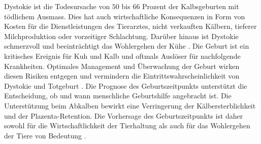Dystokie ist die Todesursache von $50$ bis $66$ Prozent der Kalbsgeburten mit tödlichem Ausmass. Dies hat auch wirtschaftliche Konsequenzen in Form von Kosten für die Dienstleistungen des Tierarztes, nicht verkauften Kälbern, tieferer Milchproduktion oder vorzeitiger Schlachtung. Darüber hinaus ist Dystokie schmerzvoll und beeinträchtigt das Wohlergehen der Kühe \citep[S. 1]{Saint-Dizier2015}. Die Geburt ist ein kritisches Ereignis für Kuh und Kalb und oftmals Auslöser für nachfolgende Krankheiten. Optimales Management und Überwachung der Geburt wirken diesen Risiken entgegen und vermindern die Eintrittswahrscheinlichkeit von Dystokie und Totgeburt \citep[S. 1]{Lange2017}. Die Prognose des Geburtszeitpunkts unterstützt die Entscheidung, ob und wann menschliche Geburtshilfe angebracht ist. Die Unterstützung beim Abkalben bewirkt eine Verringerung der Kälbersterblichkeit und der \gls{Plazenta}-\gls{Retention}. Die Vorhersage des Geburtszeitpunkts ist daher sowohl für die Wirtschaftlichkeit der Tierhaltung als auch für das Wohlergehen der Tiere von Bedeutung \citep[S. 1]{Saint-Dizier2015}.  


